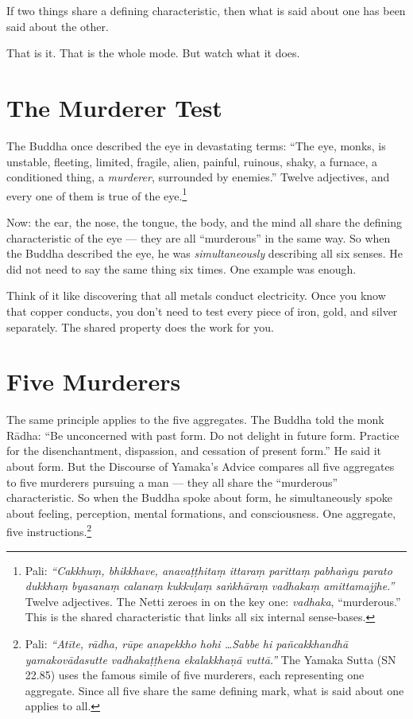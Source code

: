If two things share a defining characteristic, then what is said about one has been said about the other.

That is it. That is the whole mode. But watch what it does.

\section*{The Murderer Test}

The Buddha once described the eye in devastating terms: ``The eye, monks, is unstable, fleeting, limited, fragile, alien, painful, ruinous, shaky, a furnace, a conditioned thing, a \textit{murderer}, surrounded by enemies.'' Twelve adjectives, and every one of them is true of the eye.\footnote{Pali: \textit{``Cakkhuṃ, bhikkhave, anavaṭṭhitaṃ ittaraṃ parittaṃ pabhaṅgu parato dukkhaṃ byasanaṃ calanaṃ kukkuḷaṃ saṅkhāraṃ vadhakaṃ amittamajjhe.''} Twelve adjectives. The Netti zeroes in on the key one: \textit{vadhaka}, ``murderous.'' This is the shared characteristic that links all six internal sense-bases.}

Now: the ear, the nose, the tongue, the body, and the mind all share the defining characteristic of the eye --- they are all ``murderous'' in the same way. So when the Buddha described the eye, he was \textit{simultaneously} describing all six senses. He did not need to say the same thing six times. One example was enough.

Think of it like discovering that all metals conduct electricity. Once you know that copper conducts, you don't need to test every piece of iron, gold, and silver separately. The shared property does the work for you.

\section*{Five Murderers}

The same principle applies to the five aggregates. The Buddha told the monk Rādha: ``Be unconcerned with past form. Do not delight in future form. Practice for the disenchantment, dispassion, and cessation of present form.'' He said it about form. But the Discourse of Yamaka's Advice compares all five aggregates to five murderers pursuing a man --- they all share the ``murderous'' characteristic. So when the Buddha spoke about form, he simultaneously spoke about feeling, perception, mental formations, and consciousness. One aggregate, five instructions.\footnote{Pali: \textit{``Atīte, rādha, rūpe anapekkho hohi \ldots Sabbe hi pañcakkhandhā yamakovādasutte vadhakaṭṭhena ekalakkhaṇā vuttā.''} The Yamaka Sutta (SN 22.85) uses the famous simile of five murderers, each representing one aggregate. Since all five share the same defining mark, what is said about one applies to all.}

